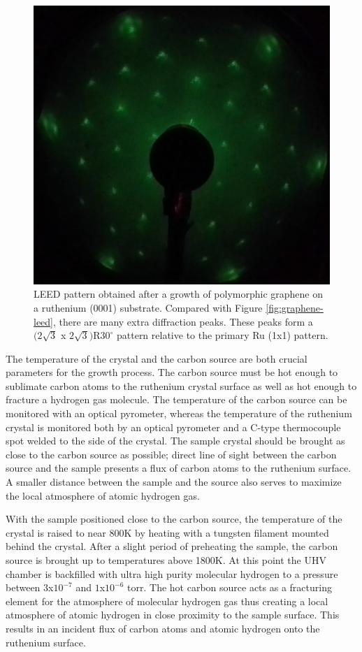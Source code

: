 \begin{figure}
  \centering
  \includegraphics[scale=0.2]{./figs/graphene-hydro-leed.png}
  \caption{
  LEED pattern obtained after a growth of polymorphic graphene on a ruthenium (0001) substrate. Compared with Figure \ref{fig:graphene-leed}, there are many extra diffraction peaks. These peaks form a $(2\sqrt{3}$ x $2\sqrt{3})$R$30^\circ$ pattern relative to the primary Ru (1x1) pattern.
  }
  \label{fig:graphene-hydro}
\end{figure}

The temperature of the crystal and the carbon source are both crucial parameters for the growth process. The carbon source must be hot enough to sublimate carbon atoms to the ruthenium crystal surface as well as hot enough to fracture a hydrogen gas molecule. The temperature of the carbon source can be monitored with an optical pyrometer, whereas the temperature of the ruthenium crystal is monitored both by an optical pyrometer and a C-type thermocouple spot welded to the side of the crystal. The sample crystal should be brought as close to the carbon source as possible; direct line of sight between the carbon source and the sample presents a flux of carbon atoms to the ruthenium surface. A smaller distance between the sample and the source also serves to maximize the local atmosphere of atomic hydrogen gas.

With the sample positioned close to the carbon source, the temperature of the crystal is raised to near 800K by heating with a tungsten filament mounted behind the crystal. After a slight period of preheating the sample, the carbon source is brought up to temperatures above 1800K. At this point the UHV chamber is backfilled with ultra high purity molecular hydrogen to a pressure between $3$x$10^{-7}$ and $1$x$10^{-6}$ torr. The hot carbon source acts as a fracturing element for the atmosphere of molecular hydrogen gas thus creating a local atmosphere of atomic hydrogen in close proximity to the sample surface. This results in an incident flux of carbon atoms and atomic hydrogen onto the ruthenium surface.

